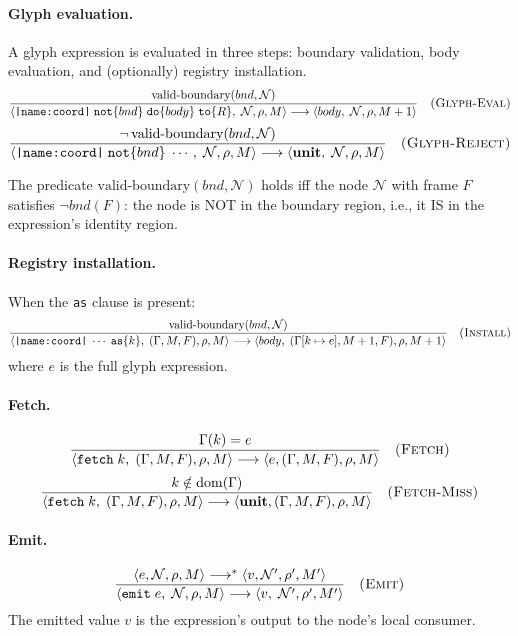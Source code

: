 \documentclass[twocolumn,11pt,a4paper]{article}
\theoremstyle{definition}
\theoremstyle{remark}
\newcommand{\Node}{\mathcal{N}}
\newcommand{\Reg}{\Gamma}
\newcommand{\reduces}{\longrightarrow}
\newcommand{\reducesN}{\longrightarrow^{*}}
\begin{document}
\paragraph{Glyph evaluation.}
A glyph expression is evaluated in three steps:
boundary validation, body evaluation, and (optionally) registry
installation.
\[
\frac{\text{valid-boundary}(bnd, \Node)}
     {\langle \texttt{|name:coord|}\; \texttt{not}\{bnd\}\;
      \texttt{do}\{body\}\; \texttt{to}\{R\},\;
      \Node, \rho, M \rangle \reduces
      \langle body,\; \Node, \rho, M+1 \rangle}
\quad\textsc{(Glyph-Eval)}
\]
\[
\frac{\neg\,\text{valid-boundary}(bnd, \Node)}
     {\langle \texttt{|name:coord|}\; \texttt{not}\{bnd\}\;\cdots,\;
      \Node, \rho, M \rangle \reduces
      \langle \mathbf{unit},\; \Node, \rho, M \rangle}
\quad\textsc{(Glyph-Reject)}
\]

The predicate $\text{valid-boundary}(bnd, \Node)$ holds iff the node
$\Node$ with frame $F$ satisfies $\neg bnd(F)$: the node is NOT in the
boundary region, i.e., it IS in the expression's identity region.

\paragraph{Registry installation.}
When the \texttt{as} clause is present:
\[
\frac{\text{valid-boundary}(bnd, \Node)}
     {\langle \texttt{|name:coord|}\;\cdots\;\texttt{as}\{k\},\;
      (\Reg, M, F), \rho, M \rangle \reduces
      \langle body,\; (\Reg[k \mapsto e], M+1, F), \rho, M+1 \rangle}
\quad\textsc{(Install)}
\]
where $e$ is the full glyph expression.

\paragraph{Fetch.}
\[
\frac{\Reg(k) = e}
     {\langle \texttt{fetch}\; k,\; (\Reg, M, F), \rho, M \rangle \reduces
      \langle e, (\Reg, M, F), \rho, M \rangle}
\quad\textsc{(Fetch)}
\]
\[
\frac{k \notin \mathrm{dom}(\Reg)}
     {\langle \texttt{fetch}\; k,\; (\Reg, M, F), \rho, M \rangle \reduces
      \langle \mathbf{unit}, (\Reg, M, F), \rho, M \rangle}
\quad\textsc{(Fetch-Miss)}
\]

\paragraph{Emit.}
\[
\frac{\langle e, \Node, \rho, M \rangle \reducesN
      \langle v, \Node', \rho', M' \rangle}
     {\langle \texttt{emit}\; e,\; \Node, \rho, M \rangle \reduces
      \langle v,\; \Node', \rho', M' \rangle}
\quad\textsc{(Emit)}
\]
The emitted value $v$ is the expression's output to the node's
local consumer.
\end{document}
